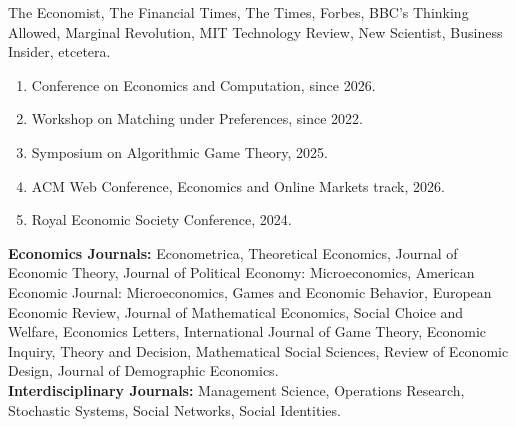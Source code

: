 \documentclass[11pt,a4paper]{article}
\begin{document}

The Economist, The Financial Times, The Times, Forbes, BBC's Thinking Allowed, Marginal Revolution, MIT Technology Review, New Scientist, Business Insider, etcetera.



\begin{enumerate}[leftmargin=*,noitemsep,partopsep=0pt,topsep=0pt,parsep=0pt]
	\item Conference on Economics and Computation, since 2026.
	\item Workshop on Matching under Preferences, since 2022.
	\item Symposium on Algorithmic Game Theory, 2025.
	\item ACM Web Conference, Economics and Online Markets track, 2026.
	\item Royal Economic Society Conference, 2024.
\end{enumerate}
\vspace{0.2cm}


\textbf{Economics Journals:} Econometrica, Theoretical Economics, Journal of Economic Theory, Journal of Political Economy: Microeconomics, American Economic Journal: Microeconomics, Games and Economic Behavior, European Economic Review, Journal of Mathematical Economics, Social Choice and Welfare, Economics Letters, International Journal of Game Theory, Economic Inquiry, Theory and Decision, Mathematical Social Sciences, Review of Economic Design, Journal of Demographic Economics.\\

\textbf{Interdisciplinary Journals:} Management Science, Operations Research, Stochastic Systems, Social Networks, Social Identities.
\vspace{0.2cm}
\newpage
	
\end{document}
